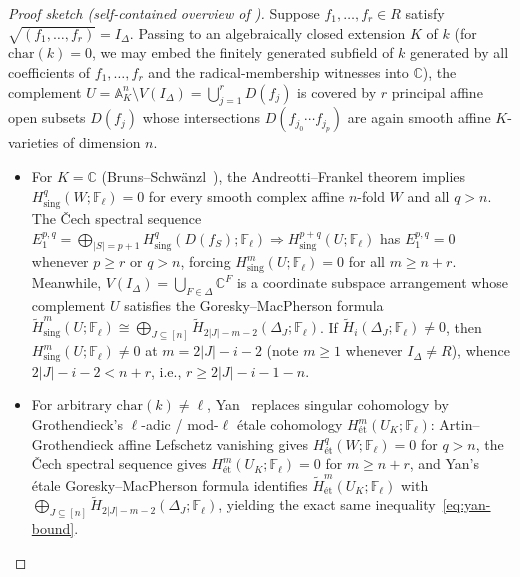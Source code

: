\documentclass[11pt,a4paper]{amsart}
\theoremstyle{plain}
\theoremstyle{definition}
\newcommand{\FF}{\mathbb{F}}
\newcommand{\CC}{\mathbb{C}}
\begin{document}
\begin{proof}[Proof sketch (self-contained overview of {\cite{BrunsSchwanzl1990,Yan2000}})]
Suppose $f_1,\dots,f_r \in R$ satisfy $\sqrt{(f_1,\dots,f_r)} = I_\Delta$. Passing to an algebraically closed extension $K$ of $k$ (for $\mathrm{char}(k) = 0$, we may embed the finitely generated subfield of $k$ generated by all coefficients of $f_1,\dots,f_r$ and the radical-membership witnesses into $\CC$), the complement $U = \mathbb{A}^n_K \setminus V(I_\Delta) = \bigcup_{j=1}^r D(f_j)$ is covered by $r$ principal affine open subsets $D(f_j)$ whose intersections $D(f_{j_0}\cdots f_{j_p})$ are again smooth affine $K$-varieties of dimension $n$.
\begin{itemize}
  \item For $K = \CC$ (Bruns--Schw\"anzl~\cite{BrunsSchwanzl1990}), the Andreotti--Frankel theorem implies $H^q_{\mathrm{sing}}(W; \FF_\ell) = 0$ for every smooth complex affine $n$-fold $W$ and all $q > n$. The \v{C}ech spectral sequence $E_1^{p,q} = \bigoplus_{|S|=p+1} H^q_{\mathrm{sing}}(D(f_S); \FF_\ell) \Rightarrow H^{p+q}_{\mathrm{sing}}(U; \FF_\ell)$ has $E_1^{p,q} = 0$ whenever $p \ge r$ or $q > n$, forcing $H^m_{\mathrm{sing}}(U; \FF_\ell) = 0$ for all $m \ge n + r$. Meanwhile, $V(I_\Delta) = \bigcup_{F \in \Delta} \CC^F$ is a coordinate subspace arrangement whose complement $U$ satisfies the Goresky--MacPherson formula $\widetilde{H}^m_{\mathrm{sing}}(U; \FF_\ell) \cong \bigoplus_{J \subseteq [n]} \widetilde{H}_{2|J| - m - 2}(\Delta_J; \FF_\ell)$. If $\widetilde{H}_i(\Delta_J; \FF_\ell) \neq 0$, then $H^m_{\mathrm{sing}}(U; \FF_\ell) \neq 0$ at $m = 2|J| - i - 2$ (note $m \ge 1$ whenever $I_\Delta \neq R$), whence $2|J| - i - 2 < n + r$, i.e., $r \ge 2|J| - i - 1 - n$.
  \item For arbitrary $\mathrm{char}(k) \neq \ell$, Yan~\cite[Theorem~2.2 and Corollary~3.2]{Yan2000} replaces singular cohomology by Grothendieck's $\ell$-adic / mod-$\ell$ \'etale cohomology $H^m_{\text{\'et}}(U_K; \FF_\ell)$: Artin--Grothendieck affine Lefschetz vanishing gives $H^q_{\text{\'et}}(W; \FF_\ell) = 0$ for $q > n$, the \v{C}ech spectral sequence gives $H^m_{\text{\'et}}(U_K; \FF_\ell) = 0$ for $m \ge n + r$, and Yan's \'etale Goresky--MacPherson formula identifies $\widetilde{H}^m_{\text{\'et}}(U_K; \FF_\ell)$ with $\bigoplus_{J \subseteq [n]} \widetilde{H}_{2|J| - m - 2}(\Delta_J; \FF_\ell)$, yielding the exact same inequality~\eqref{eq:yan-bound}. \qedhere
\end{itemize}
\end{proof}
\end{document}
